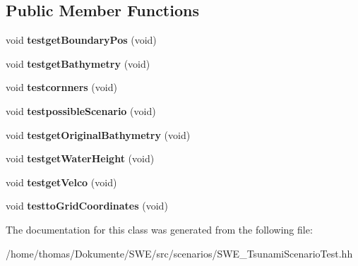 \subsection*{Public Member Functions}
\begin{DoxyCompactItemize}
\item 
\hypertarget{classSWE__TsunamiScenarioTest_ad429eb3c6a9d4e8dbf0608b03f8bc2a0}{void {\bfseries testget\-Boundary\-Pos} (void)}\label{classSWE__TsunamiScenarioTest_ad429eb3c6a9d4e8dbf0608b03f8bc2a0}

\item 
\hypertarget{classSWE__TsunamiScenarioTest_acb0b7dcdf3743badbb038697e9275e7d}{void {\bfseries testget\-Bathymetry} (void)}\label{classSWE__TsunamiScenarioTest_acb0b7dcdf3743badbb038697e9275e7d}

\item 
\hypertarget{classSWE__TsunamiScenarioTest_af989bd503a3524bb0a15ecfed9c04191}{void {\bfseries testcornners} (void)}\label{classSWE__TsunamiScenarioTest_af989bd503a3524bb0a15ecfed9c04191}

\item 
\hypertarget{classSWE__TsunamiScenarioTest_a44546bd1669635517919acd9baca218b}{void {\bfseries testpossible\-Scenario} (void)}\label{classSWE__TsunamiScenarioTest_a44546bd1669635517919acd9baca218b}

\item 
\hypertarget{classSWE__TsunamiScenarioTest_ac7a62001f23ba547088d29b6b81d0162}{void {\bfseries testget\-Original\-Bathymetry} (void)}\label{classSWE__TsunamiScenarioTest_ac7a62001f23ba547088d29b6b81d0162}

\item 
\hypertarget{classSWE__TsunamiScenarioTest_a96eb5f4cf606aaa837e12622c8722dd6}{void {\bfseries testget\-Water\-Height} (void)}\label{classSWE__TsunamiScenarioTest_a96eb5f4cf606aaa837e12622c8722dd6}

\item 
\hypertarget{classSWE__TsunamiScenarioTest_a8fbf0e1005b458cf6a3e3f924a3b1dc3}{void {\bfseries testget\-Velco} (void)}\label{classSWE__TsunamiScenarioTest_a8fbf0e1005b458cf6a3e3f924a3b1dc3}

\item 
\hypertarget{classSWE__TsunamiScenarioTest_a53e5553e72f15bf2c2894a0dc3da1eee}{void {\bfseries testto\-Grid\-Coordinates} (void)}\label{classSWE__TsunamiScenarioTest_a53e5553e72f15bf2c2894a0dc3da1eee}

\end{DoxyCompactItemize}


The documentation for this class was generated from the following file\-:\begin{DoxyCompactItemize}
\item 
/home/thomas/\-Dokumente/\-S\-W\-E/src/scenarios/S\-W\-E\-\_\-\-Tsunami\-Scenario\-Test.\-hh\end{DoxyCompactItemize}

